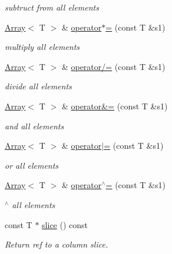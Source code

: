 \begin{DoxyCompactItemize}
\begin{DoxyCompactList}\small\item\em subtruct from all elements \end{DoxyCompactList}\item 
\mbox{\hyperlink{classXMLArray_1_1Array}{Array}}$<$ T $>$ \& \mbox{\hyperlink{classXMLArray_1_1Array_a4afa4c469f84b40f88c27273602528cc}{operator$\ast$=}} (const T \&s1)
\begin{DoxyCompactList}\small\item\em multiply all elements \end{DoxyCompactList}\item 
\mbox{\hyperlink{classXMLArray_1_1Array}{Array}}$<$ T $>$ \& \mbox{\hyperlink{classXMLArray_1_1Array_add7ef0354bf795511a654f1241da3318}{operator/=}} (const T \&s1)
\begin{DoxyCompactList}\small\item\em divide all elements \end{DoxyCompactList}\item 
\mbox{\hyperlink{classXMLArray_1_1Array}{Array}}$<$ T $>$ \& \mbox{\hyperlink{classXMLArray_1_1Array_a7f264e277398588e0e37763573f48fc7}{operator\&=}} (const T \&s1)
\begin{DoxyCompactList}\small\item\em and all elements \end{DoxyCompactList}\item 
\mbox{\hyperlink{classXMLArray_1_1Array}{Array}}$<$ T $>$ \& \mbox{\hyperlink{classXMLArray_1_1Array_a719213ff71df03fd3e561d1d4f9656cc}{operator$\vert$=}} (const T \&s1)
\begin{DoxyCompactList}\small\item\em or all elements \end{DoxyCompactList}\item 
\mbox{\hyperlink{classXMLArray_1_1Array}{Array}}$<$ T $>$ \& \mbox{\hyperlink{classXMLArray_1_1Array_ac68e4b59911e762c271c90a6aa81e0c3}{operator$^\wedge$=}} (const T \&s1)
\begin{DoxyCompactList}\small\item\em $^\wedge$ all elements \end{DoxyCompactList}\item 
const T $\ast$ \mbox{\hyperlink{classXMLArray_1_1Array_a9c9e3fdc44557d1241103c207f7f69af}{slice}} () const
\begin{DoxyCompactList}\small\item\em Return ref to a column slice. \end{DoxyCompactList}\item 

\end{DoxyCompactItemize}
